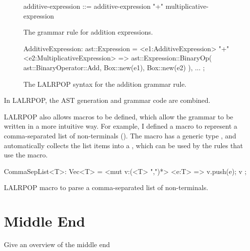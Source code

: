 \documentclass[00-main.tex]{subfiles}
\begin{document}
\begin{listing}[!ht]
  \begin{subfigure}[t]{\textwidth}
    \begin{GrammarListing}
      additive-expression ::= additive-expression "+" multiplicative-expression
    \end{GrammarListing}
    \caption{The grammar rule for addition expressions.}
  \end{subfigure}
  \par\medskip %
  \begin{subfigure}[t]{\textwidth}
    \begin{RustListing}
      AdditiveExpression: ast::Expression = {
          <e1:AdditiveExpression> "+" <e2:MultiplicativeExpression>
              => ast::Expression::BinaryOp(
                  ast::BinaryOperator::Add,
                  Box::new(e1),
                  Box::new(e2)
              ),
          ...
      };
    \end{RustListing}
    \caption{The LALRPOP syntax for the addition grammar rule.}
  \end{subfigure}
  \caption{In LALRPOP, the AST generation and grammar code are combined.}
  \label{lst:AST generation code example}
\end{listing}

LALRPOP also allows macros to be defined, which allow the grammar to be written in a more intuitive way.
For example, I defined a macro to represent a comma-separated list of non-terminals ().
The macro has a generic type , and automatically collects the list items into a , which can be used by the rules that use the macro.

\begin{listing}[!ht]
  \begin{RustListing}
    CommaSepList<T>: Vec<T> = {
        <mut v:(<T> ",")*> <e:T> => {
            v.push(e);
            v
        }
    };
  \end{RustListing}
  \caption{LALRPOP macro to parse a comma-separated list of non-terminals.}
  \label{lst:parser macro for comma-separated list}
\end{listing}

\section{Middle End}

\begin{Comment}
Give an overview of the middle end
\end{Comment}
\end{document}
